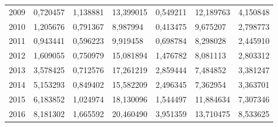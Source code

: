 \begin{table}
\begin{tabular}{p{1cm}p{2cm}p{2cm}p{2cm}p{2cm}p{2cm}p{2cm}}
 2009 &                               0,720457 &        1,138881 &        13,399015 &                  0,549211 &                                   12,189763 &                        4,150848 \\
 2010 &                               1,205676 &        0,791367 &         8,987994 &                  0,413475 &                                    9,675207 &                        2,798773 \\
 2011 &                               0,943441 &        0,596223 &         9,919458 &                  0,698784 &                                    8,298028 &                        2,445910 \\
 2012 &                               1,609055 &        0,750979 &        15,081894 &                  1,476782 &                                    8,081113 &                        2,803312 \\
 2013 &                               3,578425 &        0,712576 &        17,261219 &                  2,859444 &                                    7,484852 &                        3,381247 \\
 2014 &                               5,153293 &        0,849402 &        15,582209 &                  2,496345 &                                    7,362954 &                        3,363701 \\
 2015 &                               6,183852 &        1,024974 &        18,130096 &                  1,544497 &                                   11,884634 &                        7,307346 \\
 2016 &                               8,181302 &        1,665592 &        20,460490 &                  3,951359 &                                   13,710475 &                        8,533625 \\
\bottomrule
\end{tabular}
\end{table}
